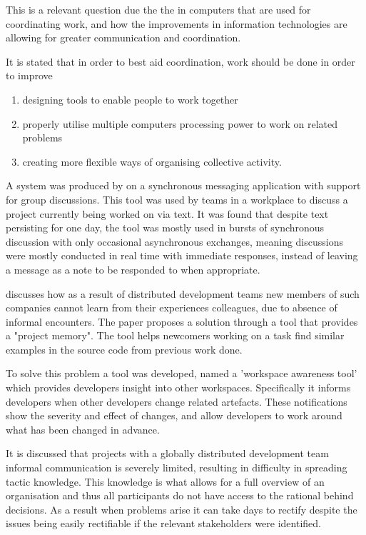 \documentclass{l4proj}
\begin{document}
This is a relevant question due the the in computers that are used for coordinating work, and how the improvements in information technologies are allowing for greater communication and coordination.

It is stated that in order to best aid coordination, work should be done in order to improve
\begin{enumerate}
\item designing tools to enable people to work together
\item properly utilise multiple computers processing power to work on related problems
\item creating more flexible ways of organising collective activity.
\end{enumerate}

A system was produced by \citet{handel02chat} on a synchronous messaging application with support for group discussions.  This tool was used by teams in a workplace to discuss a project currently being worked on via text. It was found that despite text persisting for one day, the tool was mostly used in bursts of synchronous discussion with only occasional asynchronous exchanges, meaning discussions were mostly conducted in real time with immediate responses, instead of leaving a message as a note to be responded to when appropriate. 

\citet{cubranic03hipikat} discusses how as a result of distributed development teams new members of such companies cannot learn from their experiences colleagues, due to absence of informal encounters. The paper proposes a solution through a tool that provides a "project memory".  The tool helps newcomers working on a task find similar examples in the source code from previous work done. 

To solve this problem a tool was developed, named a 'workspace awareness tool' which provides developers insight into other workspaces.  Specifically it informs developers when other developers change related artefacts.  These notifications show the severity and effect of changes, and allow developers to work around what has been changed in advance.

It is discussed that projects with a globally distributed development team informal communication is severely limited, resulting in difficulty in spreading tactic knowledge.  This knowledge is what allows for a full overview of an organisation and thus all participants do not have access to the rational behind decisions.  As a result when problems arise it can take days to rectify despite the issues being easily rectifiable if the relevant stakeholders were identified.
\end{document}
